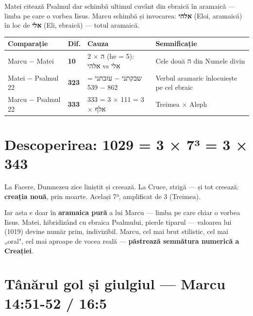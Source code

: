 \documentclass[12pt,a4paper,twoside,openany]{book}
\begin{document}
Matei citează Psalmul dar schimbă ultimul cuvânt din ebraică în aramaică — limba pe care o vorbea Iisus. Marcu schimbă și invocarea: \textbf{אלהי} (Eloi, aramaică) în loc de \textbf{אלי} (Eli, ebraică) — totul aramaică.

\small
\begin{tabular}{|p{2.5cm}|l|p{4cm}|p{4.5cm}|}
\hline
\textbf{Comparație} & \textbf{Dif.} & \textbf{Cauza} & \textbf{Semnificație} \\
\hline
Marcu − Matei & \textbf{10} & 2 × ה (he = 5): אלהי vs אלי & Cele două ה din Numele divin \\
\hline
Matei − Psalmul 22 & \textbf{323} & שבקתני − עזבתני = 862 − 539 & Verbul aramaric înlocuiește pe cel ebraic \\
\hline
Marcu − Psalmul 22 & \textbf{333} & 333 = 3 × 111 = 3 × אלף & Treimea × Aleph \\
\hline
\end{tabular}

\section{Descoperirea: 1029 = 3 × 7³ = 3 × 343}

\begin{center}
\end{center}

\bigskip

La Facere, Dumnezeu zice liniștit și creează. La Cruce, strigă — și tot creează: \textbf{creația nouă}, prin moarte. Același 7³, amplificat de 3 (Treimea).

Iar asta e doar în \textbf{aramaica pură} a lui Marcu — limba pe care chiar o vorbea Iisus. Matei, hibridizând cu ebraica Psalmului, pierde tiparul — valoarea lui (1019) devine număr prim, indivizibil. Marcu, cel mai brut stilistic, cel mai „oral", cel mai aproape de vocea reală --- \textbf{păstrează semnătura numerică a Creației}.

\section{Tânărul gol și giulgiul --- Marcu 14:51-52 / 16:5}
\end{document}
